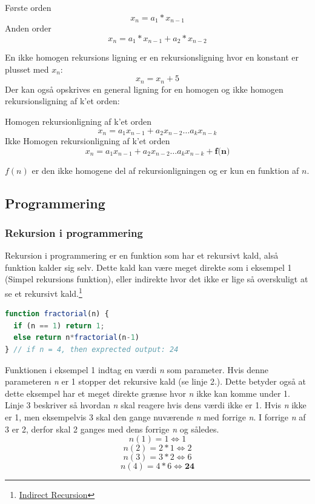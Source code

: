 \documentclass[12pt]{article}
\begin{document}
\begin{center}  
  Første orden \[x_{n}=a_{1}*x_{n-1}\]
  Anden order \[x_{n}=a_{1}*x_{n-1} +a_{2}*x_{n-2}\]
\end{center}
En ikke homogen rekursions ligning er en rekursionsligning hvor en konstant er plusset med $x_{n}$:
\[x_{n}=x_{n}+5\]
Der kan også opskrives en general ligning for en homogen og ikke homogen rekursionsligning af k'et orden:
\begin{center}  
  Homogen rekursionligning af k'et orden \[x_{n}=a_{1}x_{n-1}+a_{2}x_{n-2}\dots a_{k}x_{n-k}\]
  Ikke Homogen rekursionligning af k'et orden \[x_{n}=a_{1}x_{n-1}+a_{2}x_{n-2}\dots a_{k}x_{n-k} + \textbf{f(n)}\]
\end{center}
$f(n)$ er den ikke homogene del af rekursionligningen og er kun en funktion af $n$.
\subsection{Programmering}
\subsubsection{Rekursion i programmering}\label{Rekursion i programmering}
Rekursion i programmering er en funktion som har et rekursivt kald, alså funktion kalder sig selv. Dette kald kan være meget direkte som i eksempel 1 (Simpel rekursions funktion), eller indirekte hvor det ikke er lige så overskuligt at se et rekursivt kald.\footnote{\href{https://www.oreilly.com/library/view/functional-programming-in/9780470971109/xhtml/sec55.html}{Indirect Recursion}}
\begin{lstlisting}[language=JavaScript, caption=Simpel rekursions funktion]
function fractorial(n) {        
  if (n == 1) return 1; 
  else return n*fractorial(n-1) 
} // if n = 4, then exprected output: 24
\end{lstlisting}
Funktionen i eksempel 1 indtag en værdi \textit{n} som parameter. Hvis denne parameteren \textit{n} er 1 stopper det rekursive kald (se linje 2.). Dette betyder også at dette eksempel har et meget direkte grænse hvor \textit{n} ikke kan komme under 1. Linje 3 beskriver så hvordan \textit{n} skal reagere hvis dens værdi ikke er 1. Hvis \textit{n} ikke er 1, men eksempelvis 3 skal den gange nuværende \textit{n} med forrige \textit{n}. I forrige \textit{n} af 3 er 2, derfor skal 2 ganges med dens forrige \textit{n} og således.
\[n(1) = 1 \Leftrightarrow 1\] 
\[n(2) = 2*1 \Leftrightarrow   2\]
\[n(3) = 3*2 \Leftrightarrow   6\]
\[n(4) = 4*6 \Leftrightarrow  \textbf{24}\]
\end{document}
